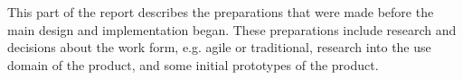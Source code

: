 This part of the report describes the preparations that were made before the main design and implementation began. 
These preparations include research and decisions about the work form, e.g. agile or traditional, research into the use domain of the product, and some initial prototypes of the product. 